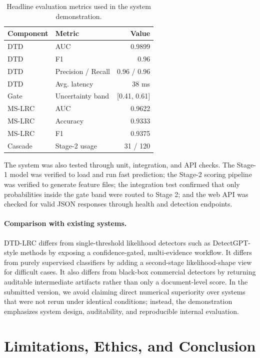 \documentclass[11pt]{article}
\begin{document}
\begin{table}[t]
\centering
\small
\begin{tabular}{llr}
\toprule
Component & Metric & Value \\
\midrule
DTD & AUC & 0.9899 \\
DTD & F1 & 0.96 \\
DTD & Precision / Recall & 0.96 / 0.96 \\
DTD & Avg. latency & 38 ms \\
Gate & Uncertainty band & [0.41, 0.61] \\
MS-LRC & AUC & 0.9622 \\
MS-LRC & Accuracy & 0.9333 \\
MS-LRC & F1 & 0.9375 \\
Cascade & Stage-2 usage & 31 / 120 \\
\bottomrule
\end{tabular}
\caption{Headline evaluation metrics used in the system demonstration.}
\label{tab:metrics}
\end{table}

The system was also tested through unit, integration, and API checks. The Stage-1 model was verified to load and run fast prediction; the Stage-2 scoring pipeline was verified to generate feature files; the integration test confirmed that only probabilities inside the gate band were routed to Stage 2; and the web API was checked for valid JSON responses through health and detection endpoints.

\paragraph{Comparison with existing systems.}
DTD-LRC differs from single-threshold likelihood detectors such as DetectGPT-style methods by exposing a confidence-gated, multi-evidence workflow. It differs from purely supervised classifiers by adding a second-stage likelihood-shape view for difficult cases. It also differs from black-box commercial detectors by returning auditable intermediate artifacts rather than only a document-level score. In the submitted version, we avoid claiming direct numerical superiority over systems that were not rerun under identical conditions; instead, the demonstration emphasizes system design, auditability, and reproducible internal evaluation.

\section{Limitations, Ethics, and Conclusion}
\end{document}
